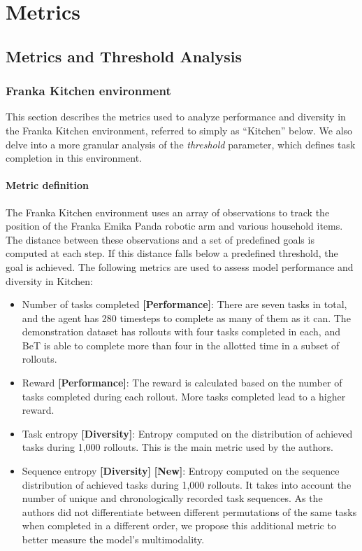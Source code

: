 \section{Metrics}\label{app:metrics}
\subsection{Metrics and Threshold Analysis}
\subsubsection{Franka Kitchen environment}

This section describes the metrics used to analyze performance and diversity in the Franka Kitchen environment, referred to simply as ``Kitchen'' below. 
We also delve into a more granular analysis of the \textit{threshold} parameter, which defines task completion in this environment.

\paragraph{Metric definition}

The Franka Kitchen environment uses an array of observations to track the position of the Franka Emika Panda robotic arm and various household items.
The distance between these observations and a set of predefined goals is computed at each step. 
If this distance falls below a predefined threshold, the goal is achieved. 
The following metrics are used to assess model performance and diversity in Kitchen:

\begin{itemize}
    \item Number of tasks completed \textbf{[Performance]}: There are seven tasks in total, and the agent has 280 timesteps to complete as many of them as it can.
    The demonstration dataset has rollouts with four tasks completed in each, and BeT is able to complete more than four in the allotted time in a subset of rollouts.
    \item Reward \textbf{[Performance]}: The reward is calculated based on the number of tasks completed during each rollout.
    More tasks completed lead to a higher reward.
    \item Task entropy \textbf{[Diversity]}: Entropy computed on the distribution of achieved tasks during 1,000 rollouts.
    This is the main metric used by the authors.
    \item Sequence entropy \textbf{[Diversity]} \textbf{[New]}: Entropy computed on the sequence distribution of achieved tasks during 1,000 rollouts. It takes into account the number of unique and chronologically recorded task sequences. As the authors did not differentiate between different permutations of the same tasks when completed in a different order, we propose this additional metric to better measure the model's multimodality.
\end{itemize}

